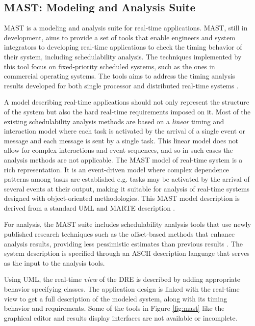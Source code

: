 \subsection{MAST: Modeling and Analysis Suite}

MAST \cite{934015} is a modeling and analysis suite for real-time applications. MAST, still in development, aims to provide a set of tools that enable engineers and system integrators to developing real-time applications to check the timing behavior of their system, including schedulability analysis. The techniques implemented by this tool focus on fixed-priority scheduled systems, such as the ones in commercial operating systems. The tools aims to address the timing analysis results developed for both single processor \cite{liu1973scheduling, klein2012practitioner} and distributed real-time systems \cite{palencia1999exploiting, tindell1994holistic}. 

A model describing real-time applications should not only represent the structure of the system but also the hard real-time requirements imposed on it. Most of the existing schedulability analysis methods are based on a \emph{linear} timing and interaction model where each task is activated by the arrival of a single event or message and each message is sent by a single task. This linear model does not allow for complex interactions and event sequences, and so in such cases the analysis methods are not applicable. The MAST model of real-time system is a rich representation. It is an event-driven model where complex dependence patterns among tasks are established e.g. tasks may be activated by the arrival of several events at their output, making it suitable for analysis of real-time systems designed with object-oriented methodologies. This MAST model description is derived from a standard UML and MARTE description \cite{medina2011}. 

For analysis, the MAST suite includes schedulability analysis tools that use newly published research techniques such as the offset-based methods \cite{palencia1998schedulability} that enhance analysis results, providing less pessimistic estimates than previous results \cite{tindell1994holistic}. The system description is specified through an ASCII description language that serves as the input to the analysis tools. 

Using UML, the real-time \emph{view} of the DRE is described \cite{selic2000generic} by adding appropriate behavior specifying classes. The application design is linked with the real-time view to get a full description of the modeled system, along with its timing behavior and requirements. Some of the tools in Figure \ref{fig:mast} like the graphical editor and results display interfaces are not available or incomplete.

